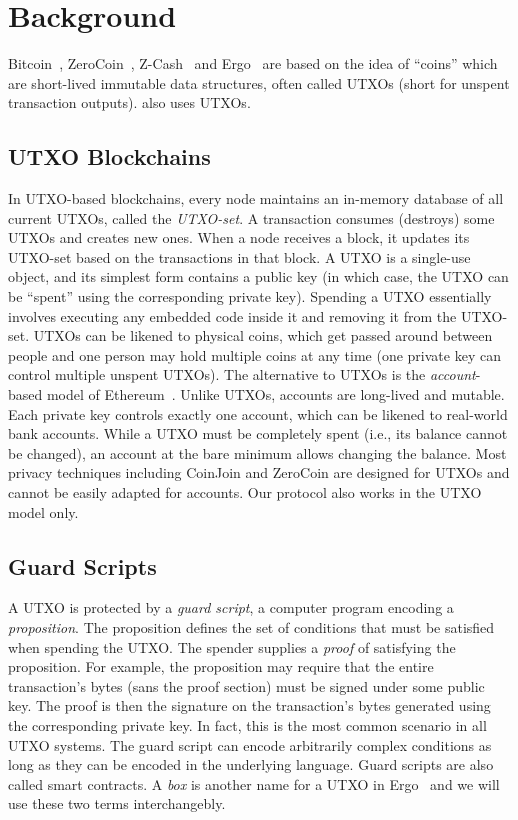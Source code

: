 \documentclass[11pt]{article}
\begin{document}
\section{Background}

Bitcoin~\cite{Nak08}, ZeroCoin~\cite{zerocoin}, Z-Cash~\cite{zcash} and Ergo~\cite{ergo} are based on the idea of ``coins'' which are short-lived immutable data structures, often called UTXOs (short for {unspent transaction outputs}). \algname also uses UTXOs. 

\subsection{UTXO Blockchains}
In UTXO-based blockchains, every node maintains an in-memory database of all current UTXOs, called the {\em UTXO-set}. A transaction consumes (destroys) some UTXOs and creates new ones. When a node receives a block, it updates its UTXO-set based on the transactions in that block. A UTXO is a single-use object, and its simplest form contains a public key (in which case, the UTXO can be ``spent'' using the corresponding private key). Spending a UTXO essentially involves executing any embedded code inside it and removing it from the UTXO-set. UTXOs can be likened to physical coins, which get passed around between people and one person may hold multiple coins at any time (one private key can control multiple unspent UTXOs). 
The alternative to UTXOs is the {\em account}-based model of Ethereum~\cite{wood2014ethereum}. Unlike UTXOs, accounts are long-lived and mutable. Each private key controls exactly one account, which can be likened to real-world bank accounts. While a UTXO must be completely spent (i.e., its balance cannot be changed), an account at the bare minimum allows changing the balance. Most privacy techniques including CoinJoin and ZeroCoin are designed for UTXOs and cannot be easily adapted for accounts. Our protocol also works in the UTXO model only. %

\subsection{Guard Scripts}
A UTXO is protected by a {\em guard script}, a computer program encoding a {\em proposition}. The proposition defines the set of conditions that must be satisfied when spending the UTXO. The spender supplies a {\em proof} of satisfying the proposition. For example, the proposition may require that the entire transaction's bytes (sans the proof section) must be signed under some public key. The proof is then the signature on the transaction's bytes generated using the corresponding private key. In fact, this is the most common scenario in all UTXO systems. 
The guard script can encode arbitrarily complex conditions as long as they can be encoded in the underlying language. 
Guard scripts are also called smart contracts. A {\em box} is another name for a UTXO in Ergo~\cite{ergo} and we will use these two terms interchangebly.
\end{document}

